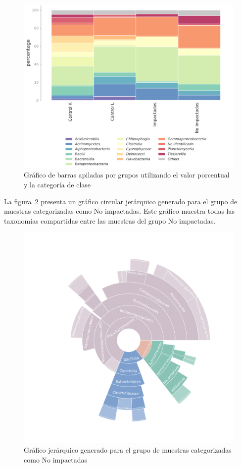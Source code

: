 \begin{figure}[H]
    \centering
    \includegraphics[width=1\linewidth,height=0.4\textheight]{images/pipeline/class_grouped_percentage.pdf}
    \caption{Gráfico de barras apiladas por grupos utilizando el valor porcentual y la categoría de clase}
    \label{fig:pipeline-stacked-group}
\end{figure}

La figura~\ref{fig:pipeline-core} presenta un gráfico circular jerárquico generado para el grupo de muestras categorizadas como No impactadas.
Este gráfico muestra todas las taxonomías compartidas entre las muestras del grupo No impactadas.
\begin{figure}[H]
    \centering
    \includegraphics[width=0.9\linewidth]{images/pipeline/core_Impactadas.pdf}
    \caption{Gráfico jerárquico generado para el grupo de muestras categorizadas como No impactadas}
    \label{fig:pipeline-core}
\end{figure}

